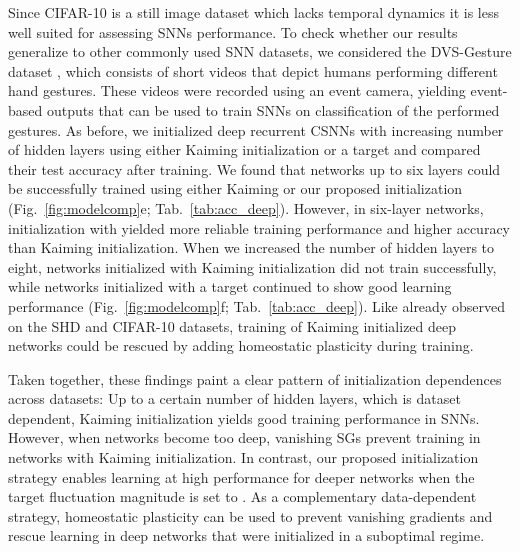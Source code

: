 \documentclass[11pt,a4paper]{article}
\begin{document}
Since CIFAR-10 is a still image dataset which lacks temporal dynamics it is less well suited for assessing \acp{SNN} performance. 
To check whether our results generalize to other commonly used \ac{SNN} datasets, we considered the DVS-Gesture dataset \citep{Amir2017-ks}, which consists of short videos that depict humans performing different hand gestures.
These videos were recorded using an event camera, yielding event-based outputs that can be used to train \acp{SNN} on classification of the performed gestures.
As before, we initialized deep recurrent \acp{CSNN} with increasing number of hidden layers using either Kaiming initialization or a target  and compared their test accuracy after training.
We found that networks up to six layers could be successfully trained using either Kaiming or our proposed initialization (Fig.~\ref{fig:modelcomp}e; Tab.~\ref{tab:acc_deep}).
However, in six-layer networks, initialization with  yielded more reliable training performance and higher accuracy than Kaiming initialization.
When we increased the number of hidden layers to eight, networks initialized with Kaiming initialization did not train successfully, while networks initialized with a target  continued to show good learning performance (Fig.~\ref{fig:modelcomp}f; Tab.~\ref{tab:acc_deep}).
Like already observed on the SHD and CIFAR-10 datasets, training of Kaiming initialized deep networks could be rescued by adding homeostatic plasticity during training. 

Taken together, these findings paint a clear pattern of initialization dependences across datasets: 
Up to a certain number of hidden layers, which is dataset dependent, Kaiming initialization yields good training performance in \acp{SNN}. 
However, when networks become too deep, vanishing \acp{SG} prevent training in networks with Kaiming initialization. 
In contrast, our proposed initialization strategy enables learning at high performance for deeper networks when the target fluctuation magnitude is set to .
As a complementary data-dependent strategy, homeostatic plasticity can be used to prevent vanishing gradients and rescue learning in deep networks that were initialized in a suboptimal regime.
\end{document}
